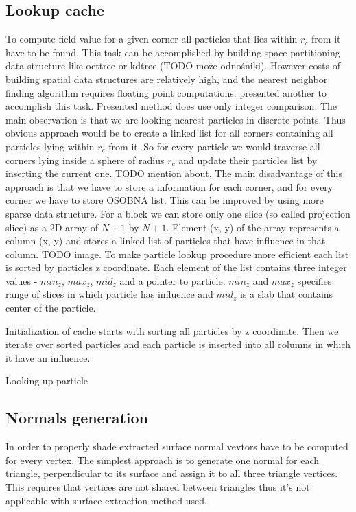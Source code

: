\subsection{Lookup cache}\label{sec:lookupcache}
To compute field value for a given corner all particles that lies within $r_c$ from it have to be found. This task can be accomplished by building space partitioning data structure like octtree or kdtree (TODO może odnośniki). However costs of building spatial data structures are relatively high, and the nearest neighbor finding algorithm requires floating point computations. \cite{RosenbergBirdwell2008} presented another to accomplish this task. Presented method does use only integer comparison. The main observation is that we are looking nearest particles in discrete points. Thus obvious approach would be to create a linked list for all corners containing all particles lying within $r_c$ from it. So for every particle we would traverse all corners lying inside a sphere of radius $r_c$ and update their particles list by inserting the current one. TODO mention about. The main disadvantage of this approach is that we have to store a information for each corner, and for every corner we have to store OSOBNA list. This can be improved by using more sparse data structure. For a block we can store only one slice (so called projection slice) as a 2D array of $N+1$ by $N+1$. Element (x, y) of the array represents a column (x, y) and stores a linked list of particles that have influence in that column. TODO image. To make particle lookup procedure more efficient each list is sorted by particles z coordinate. Each element of the list contains three integer values - $min_z$, $max_z$, $mid_z$ and a pointer to particle. $min_z$ and $max_z$ specifies range of slices in which particle has influence and $mid_z$ is a slab that contains center of the particle. 

Initialization of cache starts with sorting all particles by z coordinate. Then we iterate over sorted particles and each particle is inserted into all columns in which it have an influence. 

Looking up particle

\subsection{Normals generation}\label{sec:normals}
In order to properly shade extracted surface normal vevtors have to be computed for every vertex. The simplest approach is to generate one normal for each triangle, perpendicular to its surface and assign it to all three triangle vertices. This requires that vertices are not shared between triangles thus it's not applicable with surface extraction method used. 

